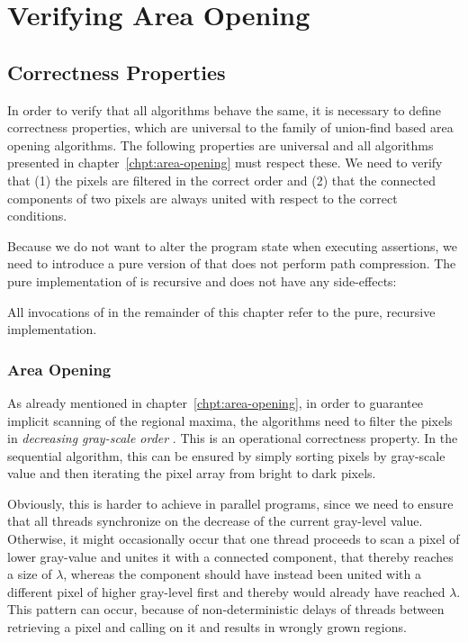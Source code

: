 \section{Verifying Area Opening}
\label{sec:correctness-area-opening}

\subsection{Correctness Properties}
\label{sec:correctness-area-opening-properties}

In order to verify that all algorithms behave the same, it is necessary to
define correctness properties, which are universal to the family of union-find
based area opening algorithms. The following properties are universal and all
algorithms presented in chapter~\ref{chpt:area-opening} must respect these. We
need to verify that (1) the pixels are filtered in the correct order and (2)
that the connected components of two pixels are always united with respect to
the correct conditions.

Because we do not want to alter the program state when executing assertions, we
need to introduce a pure version of  that does not perform path
compression. The pure implementation of  is recursive and does
not have any side-effects:



All invocations of  in the remainder of this chapter refer to
the pure, recursive implementation.

\subsubsection{Area Opening}
\label{sec:correctness-area-opening-properties-ao}

As already mentioned in chapter~\ref{chpt:area-opening}, in order to guarantee
implicit scanning of the regional maxima, the algorithms need to filter the
pixels in \emph{decreasing gray-scale order} \cite{Meijster2002Comparison}. This
is an operational correctness property. In the sequential algorithm, this can be
ensured by simply sorting pixels by gray-scale value and then iterating the
pixel array from bright to dark pixels.

Obviously, this is harder to achieve in parallel programs, since we need to
ensure that all threads synchronize on the decrease of the current gray-level
value. Otherwise, it might occasionally occur that one thread proceeds to scan a
pixel of lower gray-value and unites it with a connected component, that thereby
reaches a size of $\lambda$, whereas the component should have instead been
united with a different pixel of higher gray-level first and thereby would
already have reached $\lambda$. This pattern can occur, because of
non-deterministic delays of threads between retrieving a pixel and calling
 on it and results in wrongly grown regions.

